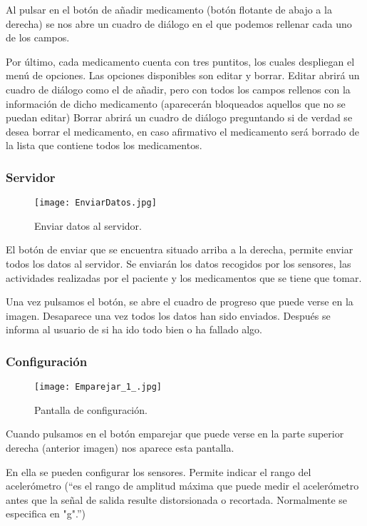 \documentclass[11pt,spanish]{article}
\begin{document}
Al pulsar en el botón de añadir medicamento (botón flotante de abajo a la derecha) se nos abre un cuadro de diálogo en el que podemos rellenar cada uno de los campos.
\newline

Por último, cada medicamento cuenta con tres puntitos, los cuales despliegan el menú de opciones. Las opciones disponibles son editar y borrar. Editar abrirá un cuadro de diálogo como el de añadir, pero con todos los campos rellenos con la información de dicho medicamento (aparecerán bloqueados aquellos que no se puedan editar) Borrar abrirá un cuadro de diálogo preguntando si de verdad se desea borrar el medicamento, en caso afirmativo el medicamento será borrado de la lista que contiene todos los medicamentos.

\subsubsection{Servidor}
\begin{figure}[!htb]
\centering
\texttt{[image: EnviarDatos.jpg]}
\caption{Enviar datos al servidor.}
\end{figure}

El botón de enviar que se encuentra situado arriba a la derecha, permite enviar todos los datos al servidor. Se enviarán los datos recogidos por los sensores, las actividades realizadas por el paciente y los medicamentos que se tiene que tomar.
\newline

Una vez pulsamos el botón, se abre el cuadro de progreso que puede verse en la imagen. Desaparece una vez todos los datos han sido enviados. Después se informa al usuario de si ha ido todo bien o ha fallado algo.
\newline

\subsubsection{Configuración}
\begin{figure}[!htb]
\centering
\texttt{[image: Emparejar\_1\_.jpg]}
\caption{Pantalla de configuración.}
\end{figure}

Cuando pulsamos en el botón emparejar que puede verse en la parte superior derecha (anterior imagen) nos aparece esta pantalla.

En ella se pueden configurar los sensores. Permite indicar el rango del acelerómetro (“es el rango de amplitud máxima que puede medir el acelerómetro antes que la señal de salida resulte distorsionada o recortada. Normalmente se especifica en "g".”)
\newline
\end{document}

